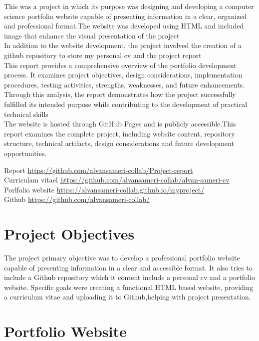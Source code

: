 \documentclass[10pt, titlepage, oneside, a4paper]{article}
\begin{document}
This was a project in which its purpose was designing and developing a computer science portfolio website capable of presenting information in a clear, organized and professional format.The website was developed using HTML and included image that enhance the visual presentation of the project\\
In addition to the website development, the project involved the creation of a github repository to store my personal cv and the project report\\
This report provides a comprehensive overview of the portfolio development process. It examines project objectives, design considerations, implementation procedures, testing activities, strengths, weaknesses, and future enhancements. Through this analysis, the report demonstrates how the project successfully fulfilled its intended purpose while contributing to the development of practical technical skills\\
The website is hosted through GitHub Pages and is publicly accessible.This report examines the complete project, including website content, repository structure, technical artifacts, design considerations and future development opportunities.

Report \url{https://github.com/alvansameri-collab/Project-report} \\
Curriculam vitael \url{https://github.com/alvansameri-collab/alvan-sameri-cv} \\
Porlfolio website \url{https://alvansameri-collab.github.io/myproject/} \\
Github \url{https://github.com/alvansameri-collab/}

\section{Project Objectives}

The project primary objective was to develop a professional portfolio website capable of presenting information in a clear and accessible format. It also tries to include a Github repository which it content include a personal cv and a portfolio website. Specific goals were creating a functional HTML based website, providing a curriculum vitae and uploading it to Github,helping with project presentation.



\section{Portfolio Website}
\end{document}
